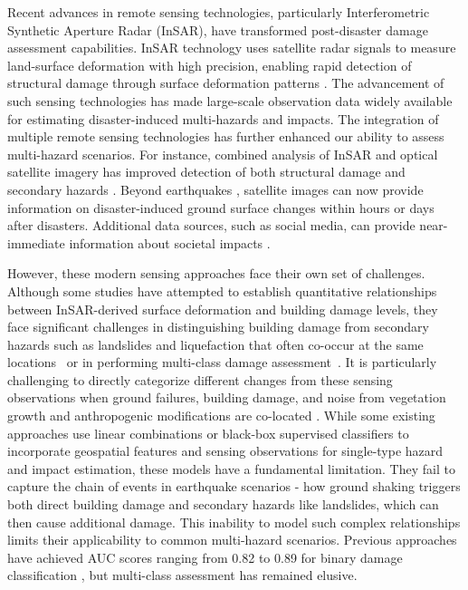 \documentclass[review]{elsarticle}
\begin{document}
Recent advances in remote sensing technologies, particularly Interferometric Synthetic Aperture Radar (InSAR), have transformed post-disaster damage assessment capabilities. InSAR technology uses satellite radar signals to measure land-surface deformation with high precision, enabling rapid detection of structural damage through surface deformation patterns \cite{yun2015rapid}. The advancement of such sensing technologies has made large-scale observation data widely available for estimating disaster-induced multi-hazards and impacts. The integration of multiple remote sensing technologies has further enhanced our ability to assess multi-hazard scenarios. For instance, combined analysis of InSAR and optical satellite imagery has improved detection of both structural damage and secondary hazards \cite{adriano2019multi, mondini2021landslide}. Beyond earthquakes \cite{yun2015damage}, satellite images can now provide information on disaster-induced ground surface changes \cite{barras2007satellite} within hours or days after disasters. Additional data sources, such as social media, can provide near-immediate information about societal impacts \cite{yates2011emergency, wang2024near}.

However, these modern sensing approaches face their own set of challenges. Although some studies have attempted to establish quantitative relationships between InSAR-derived surface deformation and building damage levels, they face significant challenges in distinguishing building damage from secondary hazards such as landslides and liquefaction that often co-occur at the same locations~\cite{li2021exploring} or in performing multi-class damage assessment~\cite{xu2022deep, xu2022seismic, wang2023causality, li2023disasternet, li2024rapid, yu2024intelligent, li2024spatial, wang2024scalable}. It is particularly challenging to directly categorize different changes from these sensing observations when ground failures, building damage, and noise from vegetation growth and anthropogenic modifications are co-located \cite{yun2015rapid}. While some existing approaches use linear combinations or black-box supervised classifiers to incorporate geospatial features and sensing observations for single-type hazard and impact estimation, these models have a fundamental limitation. They fail to capture the chain of events in earthquake scenarios - how ground shaking triggers both direct building damage and secondary hazards like landslides, which can then cause additional damage. This inability to model such complex relationships limits their applicability to common multi-hazard scenarios. Previous approaches have achieved AUC scores ranging from 0.82 to 0.89 for binary damage classification \cite{rao2023earthquake, xu2022seismic}, but multi-class assessment has remained elusive.
\end{document}
